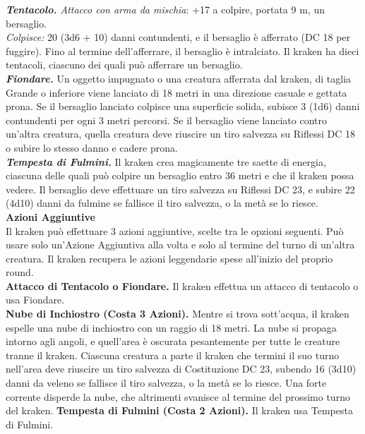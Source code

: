 \begin{multicols}{2}
\emph{\textbf{Tentacolo.} Attacco con arma da mischia}: +17 a colpire, portata 9 m, un bersaglio.\\

\emph{Colpisce:} 20 (3d6 + 10) danni contundenti, e il bersaglio è afferrato (DC 18 per fuggire). Fino al termine dell'afferrare, il bersaglio è intralciato. Il kraken ha dieci tentacoli, ciascuno dei quali può afferrare un bersaglio.\\

\emph{\textbf{Fiondare.}} Un oggetto impugnato o una creatura afferrata dal kraken, di taglia Grande o inferiore viene lanciato di 18 metri in una direzione casuale e gettata prona. Se il bersaglio lanciato colpisce una superficie solida, subisce 3 (1d6) danni contundenti per ogni 3 metri percorsi. Se il bersaglio viene lanciato contro un'altra creatura, quella creatura deve riuscire un tiro salvezza su Riflessi DC 18 o subire lo stesso danno e cadere prona.\\

\emph{\textbf{Tempesta di Fulmini.}} Il kraken crea magicamente tre saette di energia, ciascuna delle quali può colpire un bersaglio entro 36 metri e che il kraken possa vedere. Il bersaglio deve effettuare un tiro salvezza su Riflessi DC 23, e subire 22 (4d10) danni da fulmine se fallisce il tiro salvezza, o la metà se lo riesce.\\

\textbf{Azioni Aggiuntive}\\

Il kraken può effettuare 3 azioni aggiuntive, scelte tra le opzioni seguenti. Può usare solo un'Azione Aggiuntiva alla volta e solo al termine del turno di un'altra creatura. Il kraken recupera le azioni leggendarie spese all'inizio del proprio round.\\

\textbf{Attacco di Tentacolo o Fiondare.} Il kraken effettua un attacco di tentacolo o usa Fiondare.\\

\textbf{Nube di Inchiostro (Costa 3 Azioni).} Mentre si trova sott'acqua, il kraken espelle una nube di inchiostro con un raggio di 18 metri. La nube si propaga intorno agli angoli, e quell'area è oscurata pesantemente per tutte le creature tranne il kraken. Ciascuna creatura a parte il kraken che termini il suo turno nell'area deve riuscire un tiro salvezza di Costituzione DC 23, subendo 16 (3d10) danni da veleno se fallisce il tiro salvezza, o la metà se lo riesce. Una forte corrente disperde la nube, che altrimenti svanisce al termine del prossimo turno del kraken. \textbf{Tempesta di Fulmini (Costa 2 Azioni).} Il kraken usa Tempesta di Fulmini.\\


\end{multicols}
